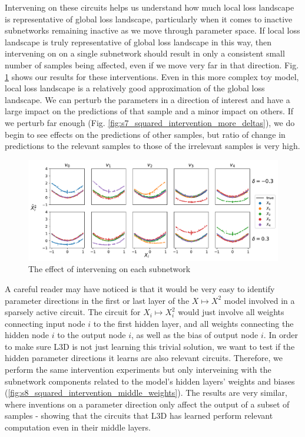 \documentclass{article}
\theoremstyle{plain}
\theoremstyle{definition}
\theoremstyle{remark}
\begin{document}
Intervening on these circuits helps us understand how much local loss landscape is representative of global loss landscape, particularly when it comes to inactive subnetworks remaining inactive as we move through parameter space. If local loss landscape is truly representative of global loss landscape in this way, then intervening on on a single subnetwork should result in only a consistent small number of samples being affected, even if we move very far in that direction. Fig. \ref{fig:9_squared_intervention} shows our results for these interventions. Even in this more complex toy model, local loss landscape is a relatively good approximation of the global loss landscape. We can perturb the parameters in a direction of interest and have a large impact on the predictions of that sample and a minor impact on others. If we perturb far enough (Fig. \ref{fig:s7_squared_intervention_more_deltas}), we do begin to see effects on the predictions of other samples, but ratio of change in predictions to the relevant samples to those of the irrelevant samples is very high.



\begin{figure}[htbp]
    \centerline{\includegraphics[width=\textwidth]{../figures/9_squared_intervention.pdf}}
    \centering
    \caption{The effect of intervening on each subnetwork}\label{fig:9_squared_intervention}
\end{figure}


A careful reader may have noticed is that it would be very easy to identify parameter directions in the first or last layer of the $X \mapsto X^2$ model involved in a sparsely active circuit. The circuit for $X_i \mapsto X_i^2$ would just involve all weights connecting input node $i$ to the first hidden layer, and all weights connecting the hidden node $i$ to the output node $i$, as well as the bias of output node $i$. In order to make sure L3D is not just learning this trivial solution, we want to test if the hidden parameter directions it learns are also relevant circuits. Therefore, we perform the same intervention experiments but only interveining with the subnetwork components related to the model's hidden layers' weights and biases (\ref{fig:s8_squared_intervention_middle_weights}). The results are very similar, where inventions on a parameter direction only affect the output of a subset of samples - showing that the circuits that L3D has learned perform relevant computation even in their middle layers. 
\end{document}
